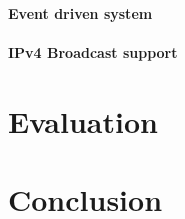 \documentclass{l4proj}
\begin{document}
\subsubsection{Event driven system} %
\label{sub:event_driven_system}


\subsubsection{IPv4 Broadcast support} %
\label{sub:ipv4_broadcast_support}






\chapter{Evaluation} %
\label{cha:evaluation}






\chapter{Conclusion} %
\label{cha:conclusion}




\begin{appendices}


\end{appendices}




\end{document}
